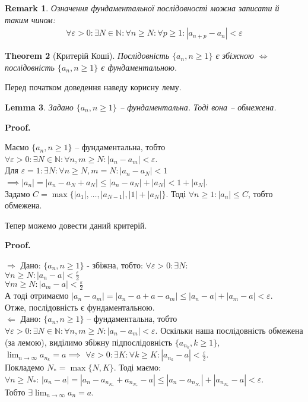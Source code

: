 \documentclass[a4paper, 14pt]{article}
\makeatletter
\def\qed{$\blacksquare$}
\def\rightproof{$\boxed{\Rightarrow}$ }
\def\leftproof{$\boxed{\Leftarrow}$ }
\theoremstyle{theoremdd}
\newtheorem{theorem}{Theorem}[subsection]
\theoremstyle{theoremdd}
\theoremstyle{theoremdd}
\theoremstyle{theoremdd}
\theoremstyle{theoremdd}
\theoremstyle{theoremdd}
\newtheorem{remark}[theorem]{Remark}
\theoremstyle{theoremdd}
\newtheorem{lemma}[theorem]{Lemma}
\theoremstyle{theoremdd}
\renewenvironment{proof}[1][Proof.\\]{\par
\pushQED{\hfill \qed}%
\normalfont \topsep6\p@\@plus6\p@\relax
\trivlist
\item\relax
{\bfseries
#1\@addpunct{.}}\hspace\labelsep\ignorespaces
}{%
\popQED\endtrivlist\@endpefalse
}
\makeatother
\begin{document}
	\begin{remark}
	Означення фундаментальної послідовності можна записати й таким чином:
	\begin{align*}
	\forall \varepsilon > 0: \exists N \in \mathbb{N}: \forall n \geq N: \forall p \geq 1: |a_{n+p} - a_n| < \varepsilon
	\end{align*}
	\end{remark}
	
	\begin{theorem}[Критерій Коші]
	Послідовність $\{a_n, n \geq 1\}$ є збіжною $\iff$ послідовність $\{a_n, n \geq 1\}$ є фундаментальною.
	\end{theorem}
	
	Перед початком доведення наведу корисну лему.
	
	\begin{lemma}
	Задано $\{a_n, n \geq 1\}$ -- фундаментальна. Тоді вона -- обмежена.
	\end{lemma}
	
	\begin{proof}
	Маємо $\{a_n, n \geq 1\}$ -- фундаментальна, тобто $\forall \varepsilon > 0: \exists N \in \mathbb{N}: \forall n,m \geq N: |a_n - a_m| < \varepsilon$.\\
	Для $\varepsilon = 1: \exists N: \forall n \geq N, m = N: |a_n - a_N| < 1$\\
	$\implies |a_n| = |a_n - a_N + a_N| \leq |a_n - a_N| + |a_N| < 1 + |a_N|$.\\
	Задамо $C = \max\{|a_1|, \dots, |a_{N-1}|, |1|+|a_N|\}$. Тоді $\forall n \geq 1: |a_n| \leq C$, тобто обмежена.
	\end{proof}
	
	Тепер можемо довести даний критерій.
	
	\begin{proof}
	\rightproof Дано: $\{a_n,n \geq 1\}$ - збіжна, тобто: $\forall \varepsilon >0: \exists N: $\\
	$\displaystyle \forall n \geq N: |a_n - a| < \frac{\varepsilon}{2}$\\
	$\displaystyle \forall m \geq N: |a_m - a| < \frac{\varepsilon}{2}$\\
	А тоді отримаємо $|a_n - a_m| = |a_n - a + a - a_m| \leq |a_n - a| + |a_m - a| < \varepsilon$.\\
	Отже, послідовність є фундаментальною.
	\bigskip \\
	\leftproof Дано: $\{a_n, n \geq 1\}$ -- фундаментальна, тобто $\forall \varepsilon > 0: \exists N \in \mathbb{N}: \forall n,m \geq N: |a_n - a_m| < \varepsilon$. Оскільки наша послідовність обмежена (за лемою), виділимо збіжну підпослідовність $\{a_{n_k}, k \geq 1\}$, \\ $\displaystyle \lim_{n \to \infty} a_{n_k} = a \implies$
	$\displaystyle \forall \varepsilon > 0: \exists K: \forall k \geq K: |a_{n_k} - a| < \frac{\varepsilon}{2}$.\\
	Покладемо $N_* = \max\{N,K\}$. Тоді маємо: \\
	$\forall n \geq N_*$: $|a_n - a| = |a_n - a_{n_{N_*}} + a_{n_{N_*}} - a| \leq |a_n - a_{n_{N_*}}| + |a_{n_{N_*}} - a| < \varepsilon$.\\
	Тобто $\displaystyle \exists \lim_{n \to \infty} a_n = a$.
	\end{proof}
	
\end{document}
